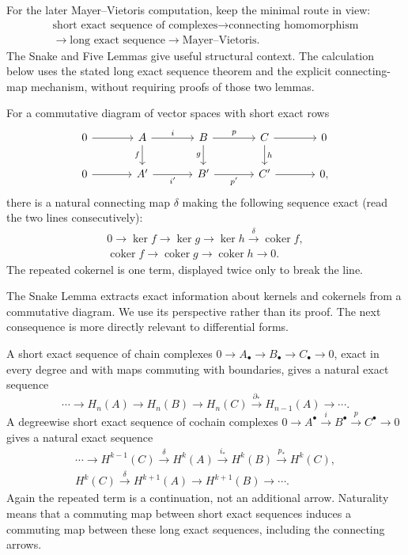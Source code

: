 For the later Mayer--Vietoris computation, keep the minimal route in view:
\[
\begin{gathered}
\text{short exact sequence of complexes}
\longrightarrow\text{connecting homomorphism}\\
\longrightarrow\text{long exact sequence}
\longrightarrow\text{Mayer--Vietoris}.
\end{gathered}
\]
The Snake and Five Lemmas give useful structural context. The calculation
below uses the stated long exact sequence theorem and the explicit
connecting-map mechanism, without requiring proofs of those two lemmas.

\begin{theorem}\label{thm:snake-lemma}
For a commutative diagram of vector spaces with short exact rows
\[
\begin{tikzcd}[column sep=large]
0\arrow[r]&A\arrow[r,"i"]\arrow[d,"f"']&B\arrow[r,"p"]\arrow[d,"g"']&C\arrow[r]\arrow[d,"h"]&0\\
0\arrow[r]&A'\arrow[r,"i'"']&B'\arrow[r,"p'"']&C'\arrow[r]&0,
\end{tikzcd}
\]
there is a natural connecting map $\delta$ making the following sequence
exact (read the two lines consecutively):
\[
\begin{gathered}
0\longrightarrow\ker f\longrightarrow\ker g\longrightarrow\ker h
\xrightarrow{\delta}\operatorname{coker}f,\\
\operatorname{coker}f\longrightarrow\operatorname{coker}g
\longrightarrow\operatorname{coker}h\longrightarrow0.
\end{gathered}
\]
The repeated cokernel is one term, displayed twice only to break the line.
\end{theorem}
The Snake Lemma extracts exact information about kernels and cokernels
from a commutative diagram. We use its perspective rather than its proof.
The next consequence is more directly relevant to differential forms.

\begin{theorem}\label{thm:long-exact-sequence}
A short exact sequence of chain complexes
$0\to A_\bullet\to B_\bullet\to C_\bullet\to0$, exact in every degree
and with maps commuting with boundaries, gives a natural exact sequence
\[
\cdots\to H_n(A)\to H_n(B)\to H_n(C)
\xrightarrow{\partial_*}H_{n-1}(A)\to\cdots.
\]
A degreewise short exact sequence of cochain complexes
$0\to A^\bullet\xrightarrow{i}B^\bullet\xrightarrow{p}C^\bullet\to0$
gives a natural exact sequence
\[
\begin{gathered}
\cdots\to H^{k-1}(C)\xrightarrow{\delta}H^k(A)
\xrightarrow{i_*}H^k(B)\xrightarrow{p_*}H^k(C),\\
H^k(C)\xrightarrow{\delta}H^{k+1}(A)\to H^{k+1}(B)\to\cdots.
\end{gathered}
\]
Again the repeated term is a continuation, not an additional arrow.
Naturality means that a commuting map between short exact sequences
induces a commuting map between these long exact sequences, including
the connecting arrows.
\end{theorem}

